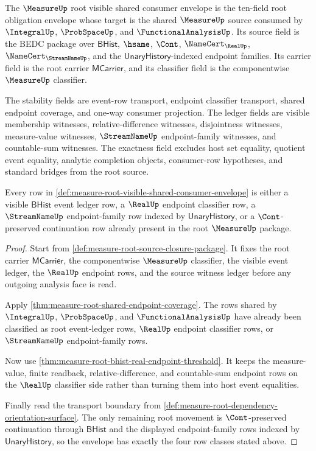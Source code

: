 \begin{definition}
\label{def:measure-root-visible-shared-consumer-envelope}
The $\MeasureUp$ root visible shared consumer envelope is the ten-field root
obligation envelope whose target is the shared $\MeasureUp$ source consumed by
$\IntegralUp$, $\ProbSpaceUp$, and $\FunctionalAnalysisUp$. Its source field is
the BEDC package over $\mathsf{BHist}$, $\hsame$, $\Cont$,
$\NameCert_{\RealUp}$, $\NameCert_{\StreamNameUp}$, and the
$\mathsf{UnaryHistory}$-indexed endpoint families. Its carrier field is the
root carrier $\mathsf{MCarrier}$, and its classifier field is the
componentwise $\MeasureUp$ classifier.

The stability fields are event-row transport, endpoint classifier transport,
shared endpoint coverage, and one-way consumer projection. The ledger fields
are visible membership witnesses, relative-difference witnesses, disjointness
witnesses, measure-value witnesses, $\StreamNameUp$ endpoint-family witnesses,
and countable-sum witnesses. The exactness field excludes host set equality,
quotient event equality, analytic completion objects, consumer-row hypotheses,
and standard bridges from the root source.
\end{definition}

\begin{theorem}
\label{thm:measure-root-visible-shared-consumer-coverage}
Every row in
\autoref{def:measure-root-visible-shared-consumer-envelope} is either a
visible $\mathsf{BHist}$ event ledger row, a $\RealUp$ endpoint classifier row,
a $\StreamNameUp$ endpoint-family row indexed by $\mathsf{UnaryHistory}$, or a
$\Cont$-preserved continuation row already present in the root $\MeasureUp$
package.
\end{theorem}
\begin{proof}
Start from \autoref{def:measure-root-source-closure-package}. It fixes the
root carrier $\mathsf{MCarrier}$, the componentwise $\MeasureUp$ classifier,
the visible event ledger, the $\RealUp$ endpoint rows, and the source witness
ledger before any outgoing analysis face is read.

Apply \autoref{thm:measure-root-shared-endpoint-coverage}. The rows shared by
$\IntegralUp$, $\ProbSpaceUp$, and $\FunctionalAnalysisUp$ have already been
classified as root event-ledger rows, $\RealUp$ endpoint classifier rows, or
$\StreamNameUp$ endpoint-family rows.

Now use \autoref{thm:measure-root-bhist-real-endpoint-threshold}. It keeps the
measure-value, finite readback, relative-difference, and countable-sum
endpoint rows on the $\RealUp$ classifier side rather than turning them into
host event equalities.

Finally read the transport boundary from
\autoref{def:measure-root-dependency-orientation-surface}. The only remaining
root movement is $\Cont$-preserved continuation through $\mathsf{BHist}$ and
the displayed endpoint-family rows indexed by $\mathsf{UnaryHistory}$, so the
envelope has exactly the four row classes stated above.
\end{proof}


